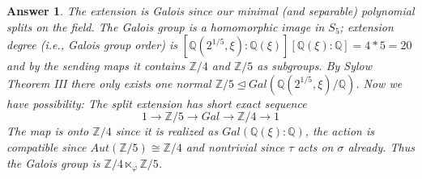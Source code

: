 \documentclass[11pt,leqno]{article}
\newcommand{\Q}{{\mathbb Q}}
\newcommand{\Z}{{\mathbb Z}}
\newcommand{\<}[1]{{\langle}#1 {\rangle}}
\theoremstyle{plain}
\newtheorem*{answer*}{Answer}
\theoremstyle{definition}
\theoremstyle{remark}
\numberwithin{equation}{section}
\begin{document}
\begin{enumerate}
\begin{answer*}
The extension is Galois since our minimal (and separable) polynomial splits on the field. The Galois group is a homomorphic image in $S_5$; extension degree (i.e., Galois group order) is $ [\Q(2^{1/5},\xi):\Q(\xi)][\Q(\xi):\Q]=4*5=20$ and by the sending maps it contains $\Z/4$ and $\Z/5$ as subgroups. By Sylow Theorem III there only exists one normal $\Z/5 \trianglelefteq Gal(\Q(2^{1/5},\xi)/\Q)$. Now we have  possibility: The split extension has short exact sequence $$1\rightarrow \Z/5 \rightarrow Gal \rightarrow \Z/4 \rightarrow 1$$  The map is onto $\Z/4$ since it is realized as $Gal(\Q(\xi):\Q)$, the action is compatible since $Aut(\Z/5)\cong \Z/4$ and nontrivial since $\tau$ acts on $\sigma$ already. Thus the Galois group is $\Z/4 \ltimes_\varphi \Z/5$.
\end{answer*}


\end{enumerate}
\end{document}
